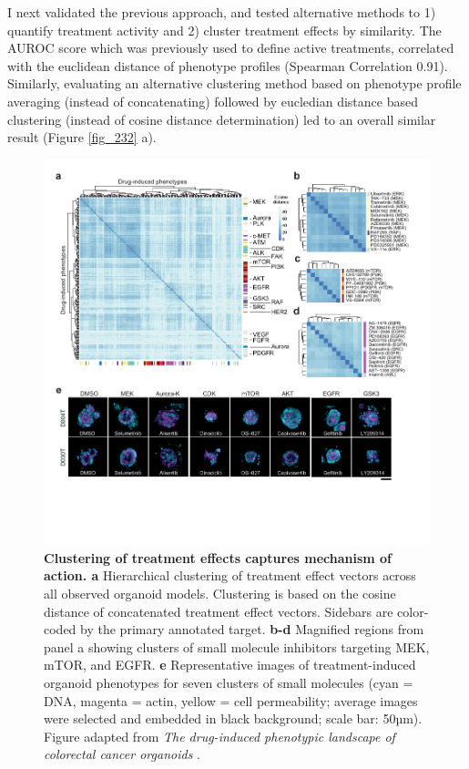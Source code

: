 \begin{flushleft}
I next validated the previous approach, and tested alternative methods to 1) quantify treatment activity and 2) cluster treatment effects by similarity. The AUROC score which was previously used to define active treatments, correlated with the euclidean distance of phenotype profiles (Spearman Correlation 0.91). Similarly, evaluating an alternative clustering method based on phenotype profile averaging (instead of concatenating) followed by eucledian distance based clustering (instead of cosine distance determination) led to an overall similar result (Figure \ref{fig_232} a). 

\begin{figure}[h!]
\centering
\includegraphics[width=\textwidth,
                height=\textheight,
                keepaspectratio]{figures/promise/pdf/fig_3_1_1.pdf}
\caption[Clustering of treatment effects captures mechanism of action]{\textbf{Clustering of treatment effects captures mechanism of action. a} Hierarchical clustering of treatment effect vectors across all observed organoid models. Clustering is based on the cosine distance of concatenated treatment effect vectors. Sidebars are color-coded by the primary annotated target. \textbf{b-d} Magnified regions from panel a showing clusters of small molecule inhibitors targeting MEK, mTOR, and EGFR. \textbf{e} Representative images of treatment-induced organoid phenotypes for seven clusters of small molecules (cyan = DNA, magenta = actin, yellow = cell permeability; average images were selected and embedded in black background; scale bar: 50µm). Figure adapted from \textit{The drug-induced phenotypic landscape of colorectal cancer organoids} \citep{betgeDruginducedPhenotypicLandscape2022}.}
\label{fig_231}
\end{figure}
\bigbreak


\end{flushleft}
